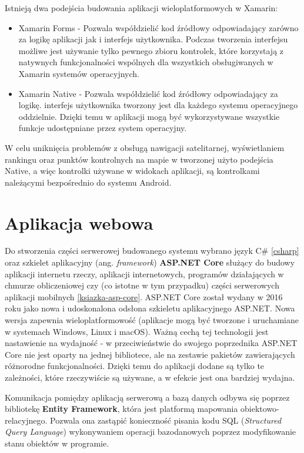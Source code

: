 Istnieją dwa podejścia budowania aplikacji wieloplatformowych w Xamarin:
\begin {itemize}
\item{Xamarin Forms} - Pozwala współdzielić kod źródłowy odpowiadający zarówno za logikę aplikacji jak i interfejs użytkownika. Podczas tworzenia interfejsu możliwe jest używanie tylko pewnego zbioru kontrolek, które korzystają z natywnych funkcjonalności wspólnych dla wszystkich obsługiwanych w Xamarin systemów operacyjnych. 
\item{Xamarin Native} - Pozwala współdzielić kod źródłowy odpowiadający za logikę. interfejs użytkownika tworzony jest dla każdego systemu operacyjnego oddzielnie. Dzięki temu w aplikacji mogą być wykorzystywane wszystkie funkcje udostępniane przez system operacyjny.
\end{itemize}
W celu uniknięcia problemów z obsługą nawigacji satelitarnej, wyświetlaniem rankingu oraz punktów kontrolnych na mapie w tworzonej użyto podejścia Native, a więc kontrolki używane w widokach aplikacji, są kontrolkami należącymi bezpośrednio do systemu Android.

\section{Aplikacja webowa}
Do stworzenia części serwerowej budowanego systemu wybrano język C\# \ref{csharp} oraz szkielet aplikacyjny (ang. \textit{framework}) \textbf{ASP.NET Core} służący do budowy aplikacji internetu rzeczy, aplikacji internetowych, programów działających w chmurze obliczeniowej czy (co istotne w tym przypadku) części serwerowych aplikacji mobilnych \ref{ksiazka-asp-core}. ASP.NET Core został wydany w 2016 roku jako nowa i udoskonalona odsłona szkieletu aplikacyjnego ASP.NET. Nowa wersja zapewnia wieloplatformowość (aplikacje mogą być tworzone i uruchamiane w systemach Windows, Linux i macOS). Ważną cechą tej technologii jest nastawienie na wydajność - w przeciwieństwie do swojego poprzednika ASP.NET Core nie jest oparty na jednej bibliotece, ale na zestawie pakietów zawierających różnorodne funkcjonalności. Dzięki temu do aplikacji dodane są tylko te zależności, które rzeczywiście są używane, a w efekcie jest ona bardziej wydajna.

Komunikacja pomiędzy aplikacją serwerową a bazą danych odbywa się poprzez bibliotekę \textbf{Entity Framework}, która jest platformą mapowania obiektowo-relacyjnego. Pozwala ona zastąpić konieczność pisania kodu SQL (\textit{Structured Query Language}) wykonywaniem operacji bazodanowych poprzez modyfikowanie stanu obiektów w programie.

